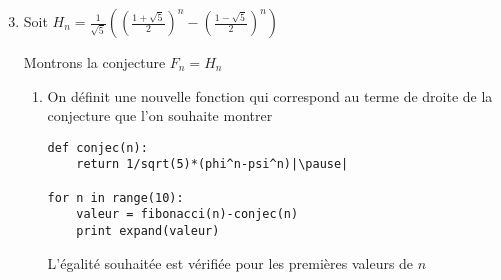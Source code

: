\begin{frame}[fragile]

\begin{enumerate}\setcounter{enumi}{2}
  \item  Soit $H_n = \frac{1}{\sqrt5}\left(\left(\tfrac{1+\sqrt5}{2}\right)^n- 
  \left(\tfrac{1-\sqrt5}{2}\right)^n\right)$
  
  \smallskip
  
  Montrons la conjecture $F_n = H_n$
  \pause
  
  \begin{enumerate}
    \item On définit une nouvelle fonction  qui correspond au terme de droite de la conjecture que l'on souhaite montrer
    
    
    
    
\begin{algo}
\begin{lstlisting}
def conjec(n):
    return 1/sqrt(5)*(phi^n-psi^n)|\pause|      

for n in range(10):
    valeur = fibonacci(n)-conjec(n)
    print expand(valeur)
\end{lstlisting}
\end{algo}

L'égalité souhaitée est vérifiée pour les premières valeurs de $n$
  \end{enumerate} 
\end{enumerate}  
\end{frame}


